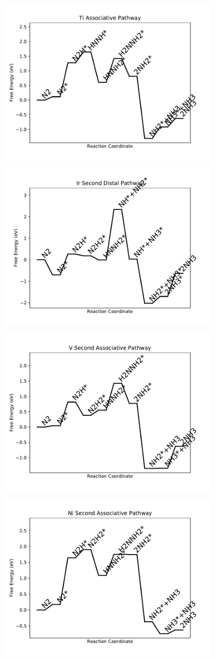 \documentclass[journal=jacsat,manuscript=article]{achemso}
\begin{document}
\begin{figure}
\includegraphics[width=0.5\linewidth]{data/plots/Ti_associative.pdf}
\label{fig:Ti_associative}
\end{figure}

\begin{figure}
\includegraphics[width=0.5\linewidth]{data/plots/Ir_distal_2.pdf}
\label{fig:Ir_distal_2}
\end{figure}

\begin{figure}
\includegraphics[width=0.5\linewidth]{data/plots/V_associative_2.pdf}
\label{fig:V_associative_2}
\end{figure}

\begin{figure}
\includegraphics[width=0.5\linewidth]{data/plots/Ni_associative_2.pdf}
\label{fig:Ni_associative_2}
\end{figure}
\end{document}
